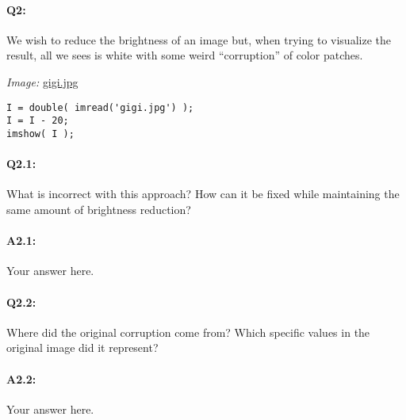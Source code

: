 \documentclass[11pt]{article}
\begin{document}

\pagebreak
\paragraph{Q2:} We wish to reduce the brightness of an image but, when trying to visualize the result, all we sees is white with some weird ``corruption'' of color patches.

\emph{Image:} \href{gigi.jpg}{gigi.jpg}

\begin{lstlisting}[style=Matlab-editor]
I = double( imread('gigi.jpg') );
I = I - 20;
imshow( I );
\end{lstlisting}

\paragraph{Q2.1:} What is incorrect with this approach? How can it be fixed while maintaining the same amount of brightness reduction?

\paragraph{A2.1:} Your answer here.




\pagebreak
\paragraph{Q2.2:} Where did the original corruption come from? Which specific values in the original image did it represent?

\paragraph{A2.2:} Your answer here.



\end{document}
